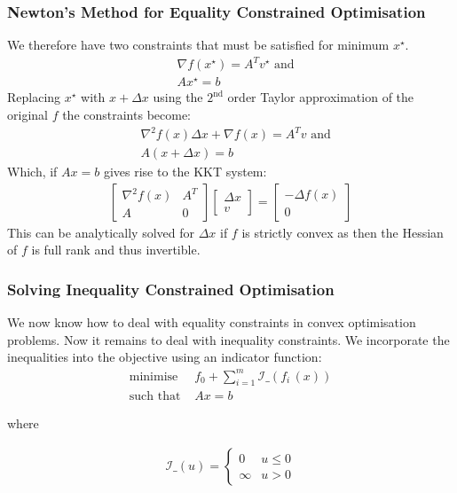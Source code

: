 \documentclass{beamer}
\begin{document}
\begin{frame}
    \frametitle{Newton's Method for Equality Constrained Optimisation}
    We therefore have two constraints that must be satisfied for minimum
    $x^{\star}$.
    \begin{align*}
        &\nabla f(x^{\star}) = A^{T} v^{\star} \text{ and} \\
        &A x^{\star} = b
    \end{align*}
    Replacing $x^{\star}$ with $x + \Delta x$ using the $2^{\text{nd}}$ order
    Taylor approximation of the original $f$ the constraints become:
    \begin{align*}
        &\nabla^{2}f(x)\Delta x + \nabla f(x) = A^{T}v \text{ and}\\
        &A(x + \Delta x) = b
    \end{align*}
    Which, if $Ax = b$ gives rise to the KKT system:
    \begin{align*}
        \begin{bmatrix}
            \nabla^{2}f(x) & A^{T} \\
            A & 0
        \end{bmatrix}
        \begin{bmatrix}
            \Delta x \\
            v
        \end{bmatrix}
        =
        \begin{bmatrix}
            -\Delta f(x) \\
            0
        \end{bmatrix}
    \end{align*}
    This can be analytically solved for $\Delta x$ if $f$ is strictly convex as
    then the Hessian of $f$ is full rank and thus invertible.
\end{frame}

\begin{frame}
    \frametitle{Solving Inequality Constrained Optimisation}
    We now know how to deal with equality constraints in convex optimisation
    problems. Now it remains to deal with inequality constraints.
    We incorporate the inequalities into the objective using an indicator
    function:
    \begin{align*}
        \text{minimise } \, &f_{0} +
        \sum_{i=1}^{m}\mathcal{I}\_\left(f_{i}\,(x)\right )\\
        \text{such that } & Ax =b
    \end{align*}

where

\begin{align*}
    \mathcal{I}\_(u) =
    \begin{cases}
        0 &u \leq 0 \\
        \infty &u > 0
    \end{cases}
\end{align*}
\end{frame}
\end{document}
